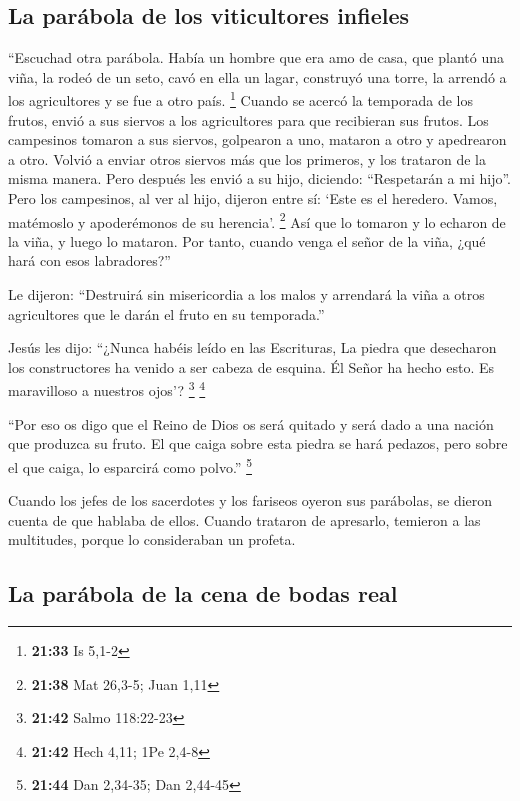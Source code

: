 \hypertarget{la-paruxe1bola-de-los-viticultores-infieles}{%
\subsection{La parábola de los viticultores
infieles}\label{la-paruxe1bola-de-los-viticultores-infieles}}

 ``Escuchad otra parábola. Había un hombre que era amo de
casa, que plantó una viña, la rodeó de un seto, cavó en ella un lagar,
construyó una torre, la arrendó a los agricultores y se fue a otro país.
\footnote{\textbf{21:33} Is 5,1-2}  Cuando se acercó la
temporada de los frutos, envió a sus siervos a los agricultores para que
recibieran sus frutos.  Los campesinos tomaron a sus
siervos, golpearon a uno, mataron a otro y apedrearon a otro.
 Volvió a enviar otros siervos más que los primeros, y
los trataron de la misma manera.  Pero después les envió
a su hijo, diciendo: ``Respetarán a mi hijo''.  Pero los
campesinos, al ver al hijo, dijeron entre sí: `Este es el heredero.
Vamos, matémoslo y apoderémonos de su herencia'. \footnote{\textbf{21:38}
  Mat 26,3-5; Juan 1,11}  Así que lo tomaron y lo echaron
de la viña, y luego lo mataron.  Por tanto, cuando venga
el señor de la viña, ¿qué hará con esos labradores?''

 Le dijeron: ``Destruirá sin misericordia a los malos y
arrendará la viña a otros agricultores que le darán el fruto en su
temporada.''

 Jesús les dijo: ``¿Nunca habéis leído en las Escrituras,
La piedra que desecharon los constructores ha venido a ser cabeza de
esquina. Él Señor ha hecho esto. Es maravilloso a nuestros ojos'?
\footnote{\textbf{21:42} Salmo 118:22-23} \footnote{\textbf{21:42} Hech
  4,11; 1Pe 2,4-8}

 ``Por eso os digo que el Reino de Dios os será quitado y
será dado a una nación que produzca su fruto.  El que
caiga sobre esta piedra se hará pedazos, pero sobre el que caiga, lo
esparcirá como polvo.'' \footnote{\textbf{21:44} Dan 2,34-35; Dan
  2,44-45}

 Cuando los jefes de los sacerdotes y los fariseos oyeron
sus parábolas, se dieron cuenta de que hablaba de ellos. 
Cuando trataron de apresarlo, temieron a las multitudes, porque lo
consideraban un profeta.

\hypertarget{la-paruxe1bola-de-la-cena-de-bodas-real}{%
\subsection{La parábola de la cena de bodas
real}\label{la-paruxe1bola-de-la-cena-de-bodas-real}}

